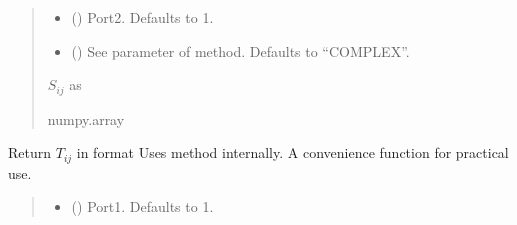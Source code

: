 \documentclass[letterpaper,10pt,english]{sphinxmanual}
\begin{document}
\begin{fulllineitems}
\begin{fulllineitems}
\begin{quote}
\begin{description}
\begin{itemize}
\item {}
\sphinxAtStartPar
{} (\sphinxstyleliteralemphasis{\sphinxupquote{, }}) \textendash{} Port\sphinxhyphen{}2. Defaults to 1.

\item {}
\sphinxAtStartPar
{} (\sphinxstyleliteralemphasis{\sphinxupquote{, }}) \textendash{} See  parameter of  method. Defaults to “COMPLEX”.

\end{itemize}

\sphinxAtStartPar
\(S_{i j}\) as 

\sphinxAtStartPar
numpy.array

\end{description}\end{quote}

\end{fulllineitems}


\begin{fulllineitems}
\label{\detokenize{touchstone:touchstone.spfile.T}}
\pysigstartsignatures
{}
\pysigstopsignatures
\sphinxAtStartPar
Return \(T_{i j}\) in format 
Uses  method internally. A convenience function for practical use.
\begin{quote}\begin{description}
\begin{itemize}
\item {}
\sphinxAtStartPar
{} (\sphinxstyleliteralemphasis{\sphinxupquote{, }}) \textendash{} Port\sphinxhyphen{}1. Defaults to 1.


\end{itemize}
\end{description}
\end{quote}
\end{fulllineitems}
\end{fulllineitems}
\end{document}
